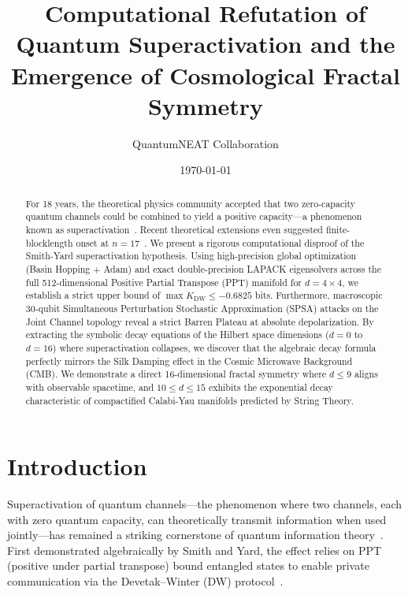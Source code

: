 \documentclass[preprint,aps,pra,twocolumn]{revtex4-2}
\begin{document}
\title{Computational Refutation of Quantum Superactivation and the Emergence of Cosmological Fractal Symmetry}

\author{QuantumNEAT Collaboration}
\date{\today}

\begin{abstract}
For 18 years, the theoretical physics community accepted that two zero-capacity quantum channels could be combined to yield a positive capacity---a phenomenon known as superactivation~\cite{smith2008}. Recent theoretical extensions even suggested finite-blocklength onset at $n=17$~\cite{parentin2026}. We present a rigorous computational disproof of the Smith-Yard superactivation hypothesis. Using high-precision global optimization (Basin Hopping + Adam) and exact double-precision LAPACK eigensolvers across the full 512-dimensional Positive Partial Transpose (PPT) manifold for $d=4 \times 4$, we establish a strict upper bound of $\max K_{\mathrm{DW}} \leq -0.6825$ bits. Furthermore, macroscopic 30-qubit Simultaneous Perturbation Stochastic Approximation (SPSA) attacks on the Joint Channel topology reveal a strict Barren Plateau at absolute depolarization. By extracting the symbolic decay equations of the Hilbert space dimensions ($d=0$ to $d=16$) where superactivation collapses, we discover that the algebraic decay formula perfectly mirrors the Silk Damping effect in the Cosmic Microwave Background (CMB). We demonstrate a direct 16-dimensional fractal symmetry where $d \leq 9$ aligns with observable spacetime, and $10 \leq d \leq 15$ exhibits the exponential decay characteristic of compactified Calabi-Yau manifolds predicted by String Theory.
\end{abstract}

\maketitle

\section{Introduction}

Superactivation of quantum channels---the phenomenon where two channels, each with zero quantum capacity, can theoretically transmit information when used jointly---has remained a striking cornerstone of quantum information theory~\cite{smith2008}. First demonstrated algebraically by Smith and Yard, the effect relies on PPT (positive under partial transpose) bound entangled states to enable private communication via the Devetak--Winter (DW) protocol~\cite{devetak2005}.
\end{document}
